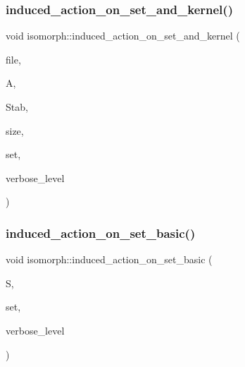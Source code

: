 \mbox{\label{classisomorph_a77563cca300ed45768afe24ce54d453a}} 
\subsubsection{\texorpdfstring{induced\+\_\+action\+\_\+on\+\_\+set\+\_\+and\+\_\+kernel()}{induced\_action\_on\_set\_and\_kernel()}}
{\footnotesize\ttfamily void isomorph\+::induced\+\_\+action\+\_\+on\+\_\+set\+\_\+and\+\_\+kernel (\begin{DoxyParamCaption}\item[{ostream \&}]{file,  }\item[{\mbox{\hyperlink{classaction}{action}} $\ast$}]{A,  }\item[{\mbox{\hyperlink{classsims}{sims}} $\ast$}]{Stab,  }\item[{\mbox{\hyperlink{galois_8h_a09fddde158a3a20bd2dcadb609de11dc}{I\+NT}}}]{size,  }\item[{\mbox{\hyperlink{galois_8h_a09fddde158a3a20bd2dcadb609de11dc}{I\+NT}} $\ast$}]{set,  }\item[{\mbox{\hyperlink{galois_8h_a09fddde158a3a20bd2dcadb609de11dc}{I\+NT}}}]{verbose\+\_\+level }\end{DoxyParamCaption})}

\mbox{\label{classisomorph_a4cf1c7b7d6691e4b864d1b900a5383b8}} 
\subsubsection{\texorpdfstring{induced\+\_\+action\+\_\+on\+\_\+set\+\_\+basic()}{induced\_action\_on\_set\_basic()}}
{\footnotesize\ttfamily void isomorph\+::induced\+\_\+action\+\_\+on\+\_\+set\+\_\+basic (\begin{DoxyParamCaption}\item[{\mbox{\hyperlink{classsims}{sims}} $\ast$}]{S,  }\item[{\mbox{\hyperlink{galois_8h_a09fddde158a3a20bd2dcadb609de11dc}{I\+NT}} $\ast$}]{set,  }\item[{\mbox{\hyperlink{galois_8h_a09fddde158a3a20bd2dcadb609de11dc}{I\+NT}}}]{verbose\+\_\+level }\end{DoxyParamCaption})}

